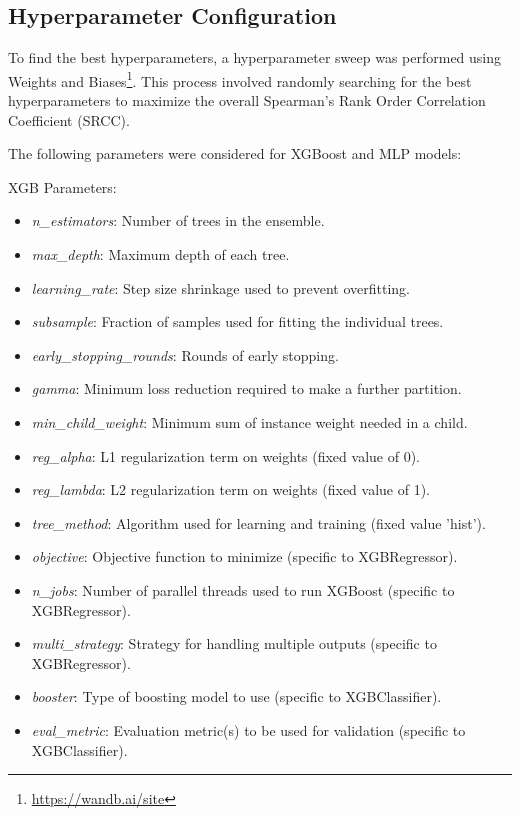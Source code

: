 \subsection{Hyperparameter Configuration}
\label{sub:HyperparamConfig}
To find the best hyperparameters, a hyperparameter sweep was performed using Weights and Biases\footnote{\url{https://wandb.ai/site}}. This process involved randomly searching for the best hyperparameters to maximize the overall Spearman’s Rank Order Correlation Coefficient (SRCC). \par
\vspace{\baselineskip}
\noindent
The following parameters were considered for XGBoost and MLP models: \par
\vspace{\baselineskip}
\noindent
XGB Parameters:
\begin{itemize} 
    \item \textit{n\_estimators}: Number of trees in the ensemble.
    \item \textit{max\_depth}: Maximum depth of each tree.
    \item \textit{learning\_rate}: Step size shrinkage used to prevent overfitting.
    \item \textit{subsample}: Fraction of samples used for fitting the individual trees.
    \item \textit{early\_stopping\_rounds}: Rounds of early stopping.
    \item \textit{gamma}: Minimum loss reduction required to make a further partition.
    \item \textit{min\_child\_weight}: Minimum sum of instance weight needed in a child.
    \item \textit{reg\_alpha}: L1 regularization term on weights (fixed value of 0).
    \item \textit{reg\_lambda}: L2 regularization term on weights (fixed value of 1).
    \item \textit{tree\_method}: Algorithm used for learning and training (fixed value 'hist').
    \item \textit{objective}: Objective function to minimize (specific to XGBRegressor).
    \item \textit{n\_jobs}: Number of parallel threads used to run XGBoost (specific to XGBRegressor).
    \item \textit{multi\_strategy}: Strategy for handling multiple outputs (specific to XGBRegressor).
    \item \textit{booster}: Type of boosting model to use (specific to XGBClassifier).
    \item \textit{eval\_metric}: Evaluation metric(s) to be used for validation (specific to XGBClassifier).
\end{itemize}
